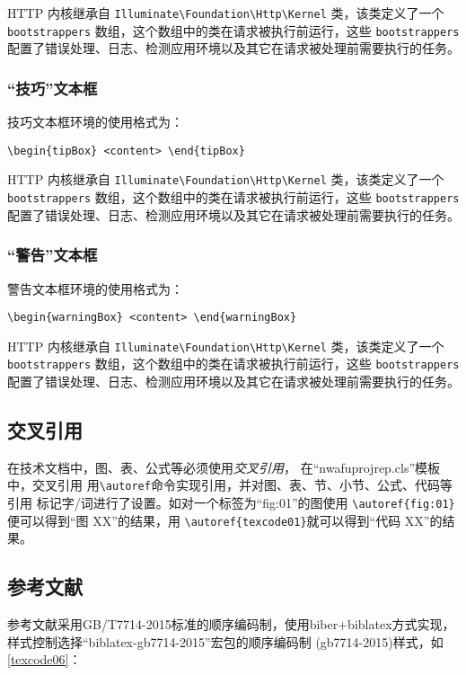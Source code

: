 \documentclass[
  ]{nwafuprojrep}
\begin{document}
\begin{importantBox}
  HTTP 内核继承自 \verb|Illuminate\Foundation\Http\Kernel| 类，该类定义了一个 \verb|bootstrappers| 数组，这个数组中的类在请求被执行前运行，这些 \verb|bootstrappers| 配置了错误处理、日志、检测应用环境以及其它在请求被处理前需要执行的任务。
\end{importantBox}
\subsubsection{\enquote{技巧}文本框}
技巧文本框环境的使用格式为：

\verb|\begin{tipBox} <content> \end{tipBox}|

\begin{tipBox}
  HTTP 内核继承自 \verb|Illuminate\Foundation\Http\Kernel| 类，该类定义了一个 \verb|bootstrappers| 数组，这个数组中的类在请求被执行前运行，这些 \verb|bootstrappers| 配置了错误处理、日志、检测应用环境以及其它在请求被处理前需要执行的任务。
\end{tipBox}
\subsubsection{\enquote{警告}文本框}
警告文本框环境的使用格式为：

\verb|\begin{warningBox} <content> \end{warningBox}|

\begin{warningBox}
  HTTP 内核继承自 \verb|Illuminate\Foundation\Http\Kernel| 类，该类定义了一个 \verb|bootstrappers| 数组，这个数组中的类在请求被执行前运行，这些 \verb|bootstrappers| 配置了错误处理、日志、检测应用环境以及其它在请求被处理前需要执行的任务。
\end{warningBox}

\subsection{交叉引用}
在技术文档中，图、表、公式等必须使用\emph{交叉引用}，
在\enquote{nwafuprojrep.cls}模板中，交叉引用
用\verb|\autoref|命令实现引用，并对图、表、节、小节、公式、代码等引用
标记字/词进行了设置。如对一个标签为\enquote{fig:01}的图使用
\verb|\autoref{fig:01}|便可以得到\enquote{图 XX}的结果，用
\verb|\autoref{texcode01}|就可以得到\enquote{代码 XX}的结果。

\subsection{参考文献}
参考文献采用GB/T7714-2015标准的顺序编码制，使用biber+biblatex方式实现，
样式控制选择\enquote{biblatex-gb7714-2015}宏包的顺序编码制
(gb7714-2015)样式，如\autoref{texcode06}：
\end{document}
